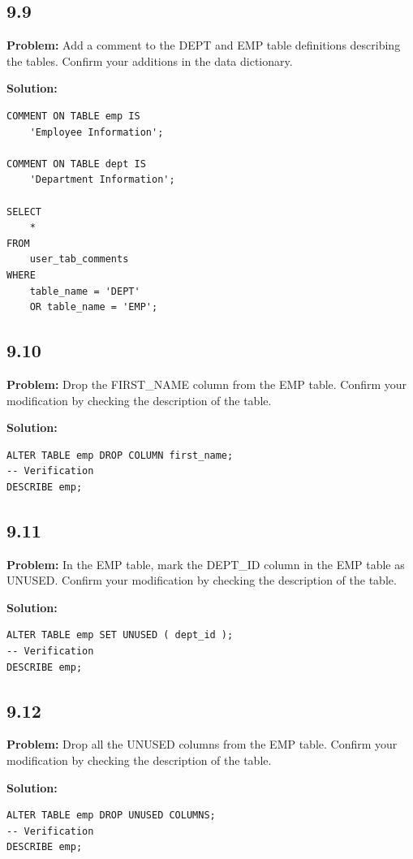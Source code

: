 \documentclass[12pt,a4paper]{article}
\begin{document}
\begin{itemize}
\subsection*{9.9}
\textbf{Problem:} Add a comment to the DEPT and EMP table definitions describing the tables. Confirm your additions in the data dictionary.

\textbf{Solution:}
\begin{lstlisting}
COMMENT ON TABLE emp IS 
    'Employee Information';

COMMENT ON TABLE dept IS
    'Department Information';

SELECT
    *
FROM
    user_tab_comments
WHERE
    table_name = 'DEPT'
    OR table_name = 'EMP';
\end{lstlisting}

\subsection*{9.10}
\textbf{Problem:} Drop the FIRST\_NAME column from the EMP table. Confirm your modification by checking the description of the table.

\textbf{Solution:}
\begin{lstlisting}
ALTER TABLE emp DROP COLUMN first_name;
-- Verification
DESCRIBE emp;
\end{lstlisting}

\subsection*{9.11}
\textbf{Problem:} In the EMP table, mark the DEPT\_ID column in the EMP table as UNUSED. Confirm your modification by checking the description of the table.

\textbf{Solution:}
\begin{lstlisting}
ALTER TABLE emp SET UNUSED ( dept_id );
-- Verification
DESCRIBE emp;
\end{lstlisting}

\subsection*{9.12}
\textbf{Problem:} Drop all the UNUSED columns from the EMP table. Confirm your modification by checking the description of the table.

\textbf{Solution:}
\begin{lstlisting}
ALTER TABLE emp DROP UNUSED COLUMNS;
-- Verification
DESCRIBE emp;
\end{lstlisting}
\newpage 

\end{itemize}
\end{document}
